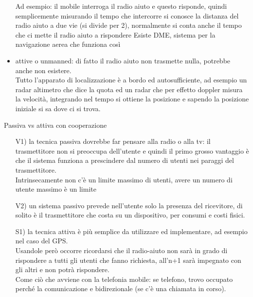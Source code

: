 \documentclass[oneside, 12pt]{extbook}
\begin{document}
\begin{itemize}
	Ad esempio: il mobile interroga il radio aiuto e questo risponde, quindi semplicemente misurando il tempo che intercorre si conosce la distanza del radio aiuto a due vie (si divide per 2), normalmente si conta anche il tempo che ci mette il radio aiuto a rispondere
	Esiste DME, sistema per la navigazione aerea che funziona così
	\item attive o unmanned: di fatto il radio aiuto non trasmette nulla, potrebbe anche non esistere.\\
	Tutto l'apparato di localizzazione è a bordo ed autosufficiente, ad esempio un radar altimetro che dice la quota ed un radar che per effetto doppler misura la velocità, integrando nel tempo si ottiene la posizione e sapendo la posizione iniziale si sa dove ci si trova.
\end{itemize}
Passiva vs attiva con cooperazione
\begin{itemize}
	\item[V1)] la tecnica passiva dovrebbe far pensare alla radio o alla tv: il trasmettitore non si preoccupa dell'utente e quindi il primo grosso vantaggio è che il sistema funziona a prescindere dal numero di utenti nei paraggi del trasmettitore.\\
	Intrinsecamente non c'è un limite massimo di utenti, avere un numero di utente massimo è un limite
	\item[V2)] un sistema passivo prevede nell'utente solo la presenza del ricevitore, di solito è il trasmettitore che costa su un dispositivo, per consumi e costi fisici.
	\item [S1)] la tecnica attiva è più semplice da utilizzare ed implementare, ad esempio nel caso del GPS.\\
	Usandole però occorre ricordarsi che il radio-aiuto non sarà in grado di rispondere a tutti gli utenti che fanno richiesta, all'n+1 sarà impegnato con gli altri e non potrà rispondere.\\
	Come ciò che avviene con la telefonia mobile: se telefono, trovo occupato perché la comunicazione e bidirezionale (se c'è una chiamata in corso).
\end{itemize}
\end{document}
